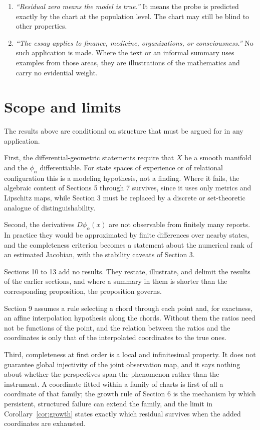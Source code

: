 \documentclass[11pt]{article}
\theoremstyle{remark}
\begin{document}
\begin{enumerate}[label=\textbf{M\arabic*.},leftmargin=2.2em,itemsep=4pt]
\item \emph{``Residual zero means the model is true.''} It means the probe is predicted exactly by the chart at the population level. The chart may still be blind to other properties.
\item \emph{``The essay applies to finance, medicine, organizations, or consciousness.''} No such application is made. Where the text or an informal summary uses examples from those areas, they are illustrations of the mathematics and carry no evidential weight.
\end{enumerate}

\section{Scope and limits}\label{sec:scope}

The results above are conditional on structure that must be argued for in any application.

First, the differential-geometric statements require that $X$ be a smooth manifold and the $\phi_\alpha$ differentiable. For state spaces of experience or of relational configuration this is a modeling hypothesis, not a finding. Where it fails, the algebraic content of Sections 5 through 7 survives, since it uses only metrics and Lipschitz maps, while Section 3 must be replaced by a discrete or set-theoretic analogue of distinguishability.

Second, the derivatives $D\phi_\alpha(x)$ are not observable from finitely many reports. In practice they would be approximated by finite differences over nearby states, and the completeness criterion becomes a statement about the numerical rank of an estimated Jacobian, with the stability caveats of Section 3.

Sections 10 to 13 add no results. They restate, illustrate, and delimit the results of the earlier sections, and where a summary in them is shorter than the corresponding proposition, the proposition governs.

Section 9 assumes a rule selecting a chord through each point and, for exactness, an affine interpolation hypothesis along the chords. Without them the ratios need not be functions of the point, and the relation between the ratios and the coordinates is only that of the interpolated coordinates to the true ones.

Third, completeness at first order is a local and infinitesimal property. It does not guarantee global injectivity of the joint observation map, and it says nothing about whether the perspectives span the phenomenon rather than the instrument. A coordinate fitted within a family of charts is first of all a coordinate of that family; the growth rule of Section 6 is the mechanism by which persistent, structured failure can extend the family, and the limit in Corollary~\ref{cor:growth} states exactly which residual survives when the added coordinates are exhausted.
\end{document}
